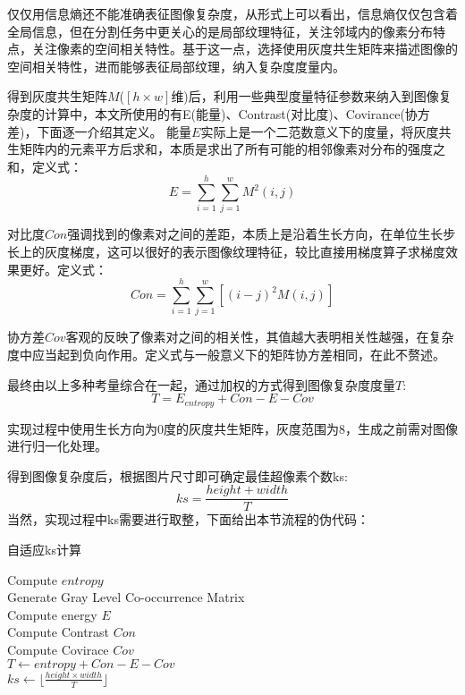 \documentclass[UTF8]{ctexart}
\begin{document}
仅仅用信息熵还不能准确表征图像复杂度，从形式上可以看出，信息熵仅仅包含着全局信息，但在分割任务中更关心的是局部纹理特征，关注邻域内的像素分布特点，关注像素的空间相关特性。基于这一点，选择使用灰度共生矩阵来描述图像的空间相关特性，进而能够表征局部纹理，纳入复杂度度量内。

得到灰度共生矩阵$M$($[h\times w]$维)后，利用一些典型度量特征参数来纳入到图像复杂度的计算中，本文所使用的有E(能量)、Contrast(对比度)、Covirance(协方差)，下面逐一介绍其定义。
能量$E$实际上是一个二范数意义下的度量，将灰度共生矩阵内的元素平方后求和，本质是求出了所有可能的相邻像素对分布的强度之和，定义式：
\begin{equation}
    E = \sum^{h}_{i=1} \sum^{w}_{j=1} M^2(i,j)
\end{equation}

对比度$Con$强调找到的像素对之间的差距，本质上是沿着生长方向，在单位生长步长上的灰度梯度，这可以很好的表示图像纹理特征，较比直接用梯度算子求梯度效果更好。定义式：
\begin{equation}
    Con = \sum^{h}_{i=1} \sum^{w}_{j=1} [(i-j)^2 M(i,j)]
\end{equation}

协方差$Cov$客观的反映了像素对之间的相关性，其值越大表明相关性越强，在复杂度中应当起到负向作用。定义式与一般意义下的矩阵协方差相同，在此不赘述。

最终由以上多种考量综合在一起，通过加权的方式得到图像复杂度度量$T$:
\begin{equation}
    T = E_{entropy} + Con - E - Cov
\end{equation}

实现过程中使用生长方向为0度的灰度共生矩阵，灰度范围为8，生成之前需对图像进行归一化处理。

得到图像复杂度后，根据图片尺寸即可确定最佳超像素个数ks:
\begin{equation}
    ks = \frac{height+width}{T}
\end{equation}
当然，实现过程中ks需要进行取整，下面给出本节流程的伪代码：

\begin{algorithm}[H]
    \caption{自适应ks计算}
    Compute $entropy$\\
    Generate Gray Level Co-occurrence Matrix\\
    Compute energy $E$\\
    Compute Contrast $Con$\\
    Compute Covirace $Cov$\\
    $T \leftarrow entropy + Con -E -Cov$\\
    $ks \leftarrow \lfloor\frac{height \times width}{T}\rfloor$

\end{algorithm}
\end{document}
